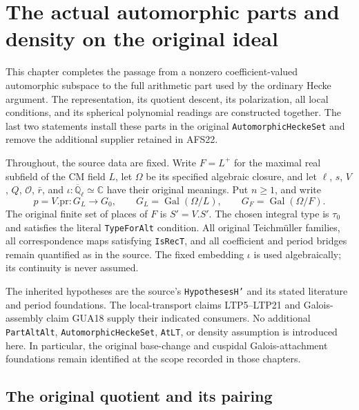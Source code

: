 \section{The actual automorphic parts and density on the original ideal}
\label{sec:automorphic-installation-v44}

This chapter completes the passage from a nonzero coefficient-valued
automorphic subspace to the full arithmetic part used by the ordinary
Hecke argument.  The representation, its quotient descent, its
polarization, all local conditions, and its spherical polynomial
readings are constructed together.  The last two statements install
these parts in the original \texttt{AutomorphicHeckeSet} and remove
the additional supplier retained in AFS22.

Throughout, the source data are fixed.  Write $F=L^+$ for the maximal
real subfield of the CM field $L$, let $\Omega$ be its specified
algebraic closure, and let $\ell$, $s$, $V$, $Q$, $\mathcal O$,
$\bar r$, and $\iota:\overline{\mathbb Q}_\ell\simeq\mathbb C$
have their original meanings.  Put $n\geq1$, and write
\[
 p=V.\mathrm{pr}:G_L\longrightarrow G_0,\qquad
 G_L=\operatorname{Gal}(\Omega/L),\qquad
 G_F=\operatorname{Gal}(\Omega/F).
\]
The original finite set of places of $F$ is $S'=V.S'$.
The chosen integral type is $\tau_0$ and satisfies the literal
\texttt{TypeForAlt} condition.  All original Teichm\"uller families,
all correspondence maps satisfying \texttt{IsRecT}, and all coefficient
and period bridges remain quantified as in the source.  The fixed
embedding $\iota$ is used algebraically; its continuity is never assumed.

The inherited hypotheses are the source's
\texttt{HypothesesH'} and its stated literature and period foundations.
The local-transport claims LTP5--LTP21 and Galois-assembly claim GUA18 supply their indicated
consumers.  No additional \texttt{PartAltAlt},
\texttt{AutomorphicHeckeSet}, \texttt{AtLT}, or density assumption is
introduced here.  In particular, the original base-change and
cuspidal Galois-attachment foundations remain identified at the scope
recorded in those chapters.

\subsection{The original quotient and its pairing}

